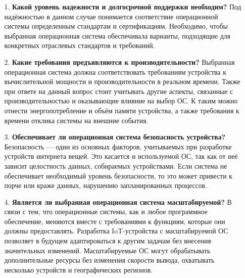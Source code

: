 \begin{enumerate}
	\item[1.] \textbf{Какой уровень надежности и долгосрочной поддержки необходим?} \newline 
	Под надёжностью в данном случае понимается соответствие операционной системы определенным стандартам и сертификациям. Необходимо, чтобы выбранная операционная система обеспечивала варианты, подходящие для конкретных отраслевых стандартов и требований.
	\item[2.] \textbf{Какие требования предъявляются к производительности?} \newline 
	Выбранная операционная система должна соответствовать требованиям устройства к вычислительной мощности и производительности в реальном времени. Также при ответе на данный вопрос стоит учитывать другие аспекты, связанные с производительностью и оказывающие влияние на выбор ОС. К таким можно отнести энергопотребление и объём памяти устройства, а также требования к времени отклика системы на внешние события.
	\item[3.] \textbf{Обеспечивает ли операционная система безопасность устройства?} \newline 
	Безопасность --- один из основных факторов, учитываемых при разработке устройств интернета вещей. Это касается и используемой ОС, так как от неё зависит целостность данных, собираемых устройствами. Если система не обеспечивает необходимый уровень безопасности, то это может привести к порче или краже данных, нарушению запланированных процессов.
	\item[4.] \textbf{Является ли выбранная операционная система масштабируемой?} \newline 
	В связи с тем, что операционные системы, как и любое программное обеспечение, меняются вместе с требованиями к функциям, которые они должны предоставлять. Разработка IoT-устройства с масштабируемой ОС позволяет в будущем адаптироваться к другим задачам без внесения значительных изменений. Масштабируемые ОС могут обрабатывать дополнительные ресурсы без изменения скорости вывода, охватывать несколько устройств и географических регионов.
\end{enumerate}






